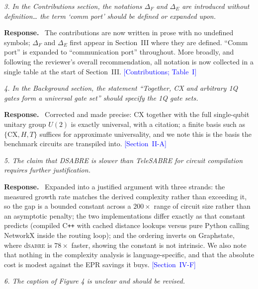 \documentclass[11pt]{article}
\newcommand{\dSABRE}{d\textsc{sabre}}
\newenvironment{comment}{\medskip\noindent\itshape}{\par}
\newcommand{\response}{\smallskip\noindent\textbf{Response.}\ }
\newcommand{\where}[1]{\textcolor{blue}{[#1]}}
\begin{document}
\begin{comment}
3. In the Contributions section, the notations $\Delta_F$ and
$\Delta_E$ are introduced without definition\ldots{} the term `comm
port' should be defined or expanded upon.
\end{comment}

\response
The contributions are now written in prose with no undefined symbols;
$\Delta_F$ and $\Delta_E$ first appear in Section~III where they are
defined.  ``Comm port'' is expanded to ``communication port''
throughout.  More broadly, and following the reviewer's overall
recommendation, all notation is now collected in a single table at the
start of Section~III.
\where{Contributions; Table~I}

\begin{comment}
4. In the Background section, the statement ``Together, CX and
arbitrary 1Q gates form a universal gate set'' should specify the 1Q
gate sets.
\end{comment}

\response
Corrected and made precise: CX together with the full single-qubit
unitary group $U(2)$ is exactly universal, with a citation; a finite
basis such as $\{\mathrm{CX},H,T\}$ suffices for approximate
universality, and we note this is the basis the benchmark circuits are
transpiled into.
\where{Section~II-A}

\begin{comment}
5. The claim that DSABRE is slower than TeleSABRE for circuit
compilation requires further justification.
\end{comment}

\response
Expanded into a justified argument with three strands: the measured
growth rate matches the derived complexity rather than exceeding it, so
the gap is a bounded constant across a $200\times$ range of circuit
size rather than an asymptotic penalty; the two implementations differ
exactly as that constant predicts (compiled C\texttt{++} with cached
distance lookups versus pure Python calling NetworkX inside the routing
loop); and the ordering inverts on Graphstate, where \dSABRE{} is
$78\times$ faster, showing the constant is not intrinsic.  We also note
that nothing in the complexity analysis is language-specific, and that
the absolute cost is modest against the EPR savings it buys.
\where{Section~IV-F}

\begin{comment}
6. The caption of Figure 4 is unclear and should be revised.
\end{comment}
\end{document}

